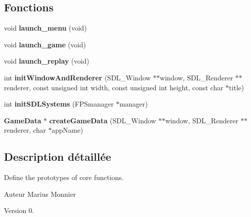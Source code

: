 \subsection*{Fonctions}
\begin{DoxyCompactItemize}
\item 
\mbox{\label{game__fonctions_8h_ab3538182e6fae78c414c6b371c6f9b77}} 
void {\bfseries launch\+\_\+menu} (void)
\item 
\mbox{\label{game__fonctions_8h_ae1e52800cf2d4cb84e2c71d6af390622}} 
void {\bfseries launch\+\_\+game} (void)
\item 
\mbox{\label{game__fonctions_8h_af44b6382ab2dcccef07d61d735915bfa}} 
void {\bfseries launch\+\_\+replay} (void)
\item 
\mbox{\label{game__fonctions_8h_ae38078a115bc28d56f1e559a188e7437}} 
int {\bfseries init\+Window\+And\+Renderer} (S\+D\+L\+\_\+\+Window $\ast$$\ast$window, S\+D\+L\+\_\+\+Renderer $\ast$$\ast$renderer, const unsigned int width, const unsigned int height, const char $\ast$title)
\item 
\mbox{\label{game__fonctions_8h_a4dd7e919802a1f82dd6020412e5db80f}} 
int {\bfseries init\+S\+D\+L\+Systems} (F\+P\+Smanager $\ast$manager)
\item 
\mbox{\label{game__fonctions_8h_a5c9adc58626460dbf4f5280f43cafebf}} 
\textbf{ Game\+Data} $\ast$ {\bfseries create\+Game\+Data} (S\+D\+L\+\_\+\+Window $\ast$$\ast$window, S\+D\+L\+\_\+\+Renderer $\ast$$\ast$renderer, char $\ast$app\+Name)
\end{DoxyCompactItemize}


\subsection{Description détaillée}
Define the prototypes of core functions. 

\begin{DoxyAuthor}{Auteur}
Marius Monnier 
\end{DoxyAuthor}
\begin{DoxyVersion}{Version}
0. 
\end{DoxyVersion}
